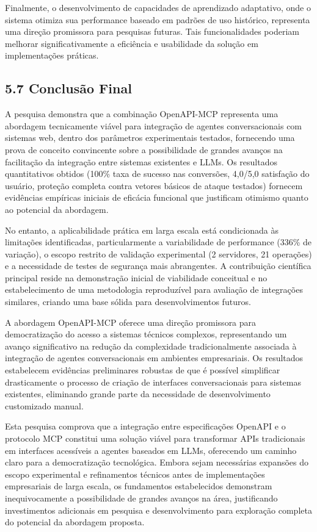 \documentclass[
]{article}
\begin{document}
Finalmente, o desenvolvimento de capacidades de aprendizado adaptativo,
onde o sistema otimiza sua performance baseado em padrões de uso
histórico, representa uma direção promissora para pesquisas futuras.
Tais funcionalidades poderiam melhorar significativamente a eficiência e
usabilidade da solução em implementações práticas.

\subsection{5.7 Conclusão Final}\label{conclusuxe3o-final}

A pesquisa demonstra que a combinação OpenAPI-MCP representa uma
abordagem tecnicamente viável para integração de agentes conversacionais
com sistemas web, dentro dos parâmetros experimentais testados,
fornecendo uma prova de conceito convincente sobre a possibilidade de
grandes avanços na facilitação da integração entre sistemas existentes e
LLMs. Os resultados quantitativos obtidos (100\% taxa de sucesso nas
conversões, 4,0/5,0 satisfação do usuário, proteção completa contra
vetores básicos de ataque testados) fornecem evidências empíricas
iniciais de eficácia funcional que justificam otimismo quanto ao
potencial da abordagem.

No entanto, a aplicabilidade prática em larga escala está condicionada
às limitações identificadas, particularmente a variabilidade de
performance (336\% de variação), o escopo restrito de validação
experimental (2 servidores, 21 operações) e a necessidade de testes de
segurança mais abrangentes. A contribuição científica principal reside
na demonstração inicial de viabilidade conceitual e no estabelecimento
de uma metodologia reproduzível para avaliação de integrações similares,
criando uma base sólida para desenvolvimentos futuros.

A abordagem OpenAPI-MCP oferece uma direção promissora para
democratização do acesso a sistemas técnicos complexos, representando um
avanço significativo na redução da complexidade tradicionalmente
associada à integração de agentes conversacionais em ambientes
empresariais. Os resultados estabelecem evidências preliminares robustas
de que é possível simplificar drasticamente o processo de criação de
interfaces conversacionais para sistemas existentes, eliminando grande
parte da necessidade de desenvolvimento customizado manual.

Esta pesquisa comprova que a integração entre especificações OpenAPI e o
protocolo MCP constitui uma solução viável para transformar APIs
tradicionais em interfaces acessíveis a agentes baseados em LLMs,
oferecendo um caminho claro para a democratização tecnológica. Embora
sejam necessárias expansões do escopo experimental e refinamentos
técnicos antes de implementações empresariais de larga escala, os
fundamentos estabelecidos demonstram inequivocamente a possibilidade de
grandes avanços na área, justificando investimentos adicionais em
pesquisa e desenvolvimento para exploração completa do potencial da
abordagem proposta.
\end{document}
